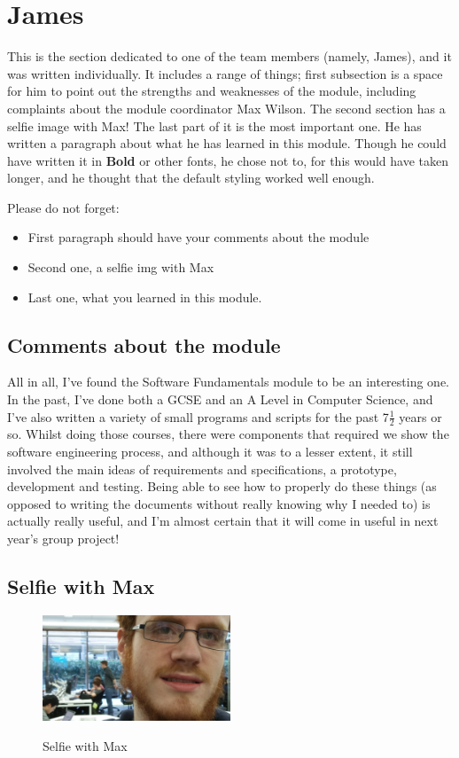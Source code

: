 \section{James}
This is the section dedicated to one of the team members (namely, James), and it was written individually. It includes a range of things; first subsection is a space for him to point out the strengths and weaknesses of the module, including complaints about the module coordinator Max Wilson. The second section has a selfie image with Max! The last part of it is the most important one. He has written a paragraph about what he has learned in this module. Though he could have written it in \textbf{Bold} or other fonts, he chose not to, for this would have taken longer, and he thought that the default styling worked well enough. 

Please do not forget:
\begin{itemize}
	\item First paragraph should have your comments about the module
	\item Second one, a selfie img with Max
	\item Last one, what you learned in this module.
\end{itemize}

\subsection{Comments about the module}
All in all, I've found the Software Fundamentals module to be an interesting one. In the past, I've done both a GCSE and an A Level in Computer Science, and I've also written a variety of small programs and scripts for the past 7\(\frac{1}{2}\) years or so. Whilst doing those courses, there were components that required we show the software engineering process, and although it was to a lesser extent, it still involved the main ideas of requirements and specifications, a prototype, development and testing. Being able to see how to properly do these things (as opposed to writing the documents without really knowing why I needed to) is actually really useful, and I'm almost certain that it will come in useful in next year's group project!

\subsection{Selfie with Max}

\begin{figure}[h]
\caption{Selfie with Max}
\centering
\includegraphics[width=0.5\textwidth]{images/MJCMAX.jpg}
\label{fig:jamesselfie}
\end{figure}

